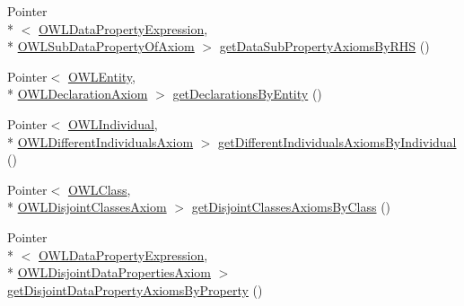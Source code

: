 \begin{DoxyCompactItemize}
\item 
Pointer\\*
$<$ \hyperlink{interfaceorg_1_1semanticweb_1_1owlapi_1_1model_1_1_o_w_l_data_property_expression}{O\-W\-L\-Data\-Property\-Expression}, \\*
\hyperlink{interfaceorg_1_1semanticweb_1_1owlapi_1_1model_1_1_o_w_l_sub_data_property_of_axiom}{O\-W\-L\-Sub\-Data\-Property\-Of\-Axiom} $>$ \hyperlink{interfaceuk_1_1ac_1_1manchester_1_1cs_1_1owl_1_1owlapi_1_1_internals_a54941eeb12abab13c2e2094b34661059}{get\-Data\-Sub\-Property\-Axioms\-By\-R\-H\-S} ()
\item 
Pointer$<$ \hyperlink{interfaceorg_1_1semanticweb_1_1owlapi_1_1model_1_1_o_w_l_entity}{O\-W\-L\-Entity}, \\*
\hyperlink{interfaceorg_1_1semanticweb_1_1owlapi_1_1model_1_1_o_w_l_declaration_axiom}{O\-W\-L\-Declaration\-Axiom} $>$ \hyperlink{interfaceuk_1_1ac_1_1manchester_1_1cs_1_1owl_1_1owlapi_1_1_internals_ab202f7884fc48ec3c27a8e1d1148bd67}{get\-Declarations\-By\-Entity} ()
\item 
Pointer$<$ \hyperlink{interfaceorg_1_1semanticweb_1_1owlapi_1_1model_1_1_o_w_l_individual}{O\-W\-L\-Individual}, \\*
\hyperlink{interfaceorg_1_1semanticweb_1_1owlapi_1_1model_1_1_o_w_l_different_individuals_axiom}{O\-W\-L\-Different\-Individuals\-Axiom} $>$ \hyperlink{interfaceuk_1_1ac_1_1manchester_1_1cs_1_1owl_1_1owlapi_1_1_internals_acff0060128cbef7f5568442e7cb16312}{get\-Different\-Individuals\-Axioms\-By\-Individual} ()
\item 
Pointer$<$ \hyperlink{interfaceorg_1_1semanticweb_1_1owlapi_1_1model_1_1_o_w_l_class}{O\-W\-L\-Class}, \\*
\hyperlink{interfaceorg_1_1semanticweb_1_1owlapi_1_1model_1_1_o_w_l_disjoint_classes_axiom}{O\-W\-L\-Disjoint\-Classes\-Axiom} $>$ \hyperlink{interfaceuk_1_1ac_1_1manchester_1_1cs_1_1owl_1_1owlapi_1_1_internals_aa21a867c46754c76f38a605f59fca7dd}{get\-Disjoint\-Classes\-Axioms\-By\-Class} ()
\item 
Pointer\\*
$<$ \hyperlink{interfaceorg_1_1semanticweb_1_1owlapi_1_1model_1_1_o_w_l_data_property_expression}{O\-W\-L\-Data\-Property\-Expression}, \\*
\hyperlink{interfaceorg_1_1semanticweb_1_1owlapi_1_1model_1_1_o_w_l_disjoint_data_properties_axiom}{O\-W\-L\-Disjoint\-Data\-Properties\-Axiom} $>$ \hyperlink{interfaceuk_1_1ac_1_1manchester_1_1cs_1_1owl_1_1owlapi_1_1_internals_a915005303431fc07a68976b10b2a6d47}{get\-Disjoint\-Data\-Property\-Axioms\-By\-Property} ()

\end{DoxyCompactItemize}
